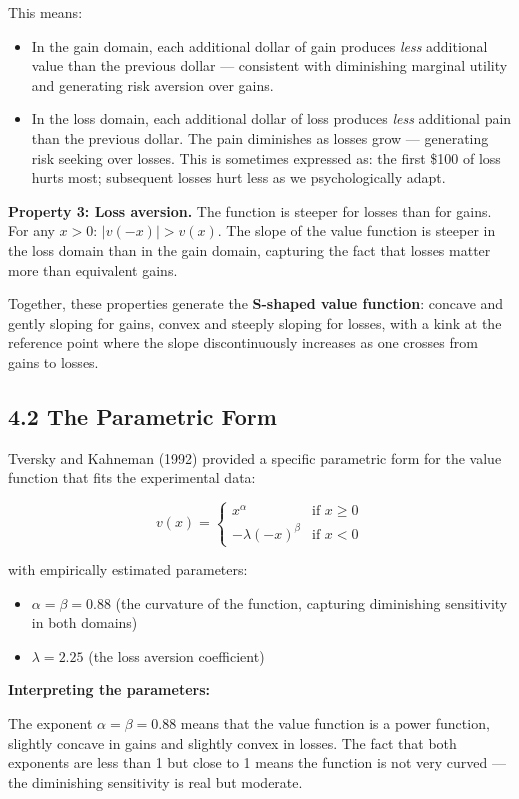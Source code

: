 \documentclass[12pt, letterpaper]{article}
\begin{document}
This means:
\begin{itemize}
\item In the gain domain, each additional dollar of gain produces \textit{less} additional value than the previous dollar --- consistent with diminishing marginal utility and generating risk aversion over gains.
\item In the loss domain, each additional dollar of loss produces \textit{less} additional pain than the previous dollar. The pain diminishes as losses grow --- generating risk seeking over losses. This is sometimes expressed as: the first \$100 of loss hurts most; subsequent losses hurt less as we psychologically adapt.
\end{itemize}

\textbf{Property 3: Loss aversion.} The function is steeper for losses than for gains. For any $x > 0$: $|v(-x)| > v(x)$. The slope of the value function is steeper in the loss domain than in the gain domain, capturing the fact that losses matter more than equivalent gains.

Together, these properties generate the \textbf{S-shaped value function}: concave and gently sloping for gains, convex and steeply sloping for losses, with a kink at the reference point where the slope discontinuously increases as one crosses from gains to losses.


\subsection{4.2 The Parametric Form}


Tversky and Kahneman (1992) provided a specific parametric form for the value function that fits the experimental data:

$$v(x) = \begin{cases} x^\alpha & \text{if } x \geq 0 \\ -\lambda(-x)^\beta & \text{if } x < 0 \end{cases}$$

with empirically estimated parameters:
\begin{itemize}
\item $\alpha = \beta = 0.88$ (the curvature of the function, capturing diminishing sensitivity in both domains)
\item $\lambda = 2.25$ (the loss aversion coefficient)
\end{itemize}

\textbf{Interpreting the parameters:}

The exponent $\alpha = \beta = 0.88$ means that the value function is a power function, slightly concave in gains and slightly convex in losses. The fact that both exponents are less than 1 but close to 1 means the function is not very curved --- the diminishing sensitivity is real but moderate.
\end{document}
